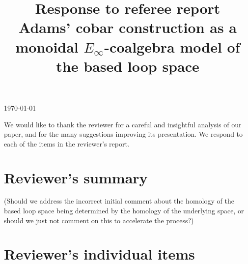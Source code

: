 \documentclass{amsart}
\title[Referee reply]{Response to referee report \\ Adams' cobar construction as a monoidal $E_{\infty}$-coalgebra model of the based loop space}
\begin{document}
	\noindent\today
	\maketitle

	We would like to thank the reviewer for a careful and insightful analysis of our paper, and for the many suggestions improving its presentation. We respond to each of the items in the reviewer's report. 

	\section{Reviewer's summary}
(Should we address the incorrect initial comment about the homology of the based loop space being determined by the homology of the underlying space, or should we just not comment on this to accelerate the process?)

	\section{Reviewer's individual items}
\end{document}
